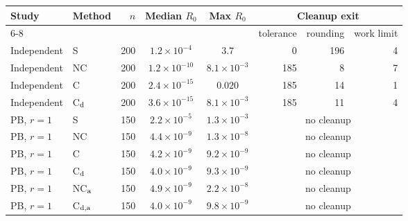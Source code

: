 \begin{tabular}{@{}llr cc rrr@{}}
\toprule
Study & Method & $n$ & Median $R_0$ & Max $R_0$ & \multicolumn{3}{c}{Cleanup exit}\\
\cmidrule(l){6-8}
 & & & & & tolerance & rounding & work limit\\
\midrule
Independent & S & 200 & $1.2\times10^{-4}$ & $3.7$ & 0 & 196 & 4\\
Independent & NC & 200 & $1.2\times10^{-10}$ & $8.1\times10^{-3}$ & 185 & 8 & 7\\
Independent & C & 200 & $2.4\times10^{-15}$ & $0.020$ & 185 & 14 & 1\\
Independent & C$_{\rm d}$ & 200 & $3.6\times10^{-15}$ & $8.1\times10^{-3}$ & 185 & 11 & 4\\
PB, $r=1$ & S & 150 & $2.2\times10^{-5}$ & $1.3\times10^{-3}$ & \multicolumn{3}{c}{no cleanup}\\
PB, $r=1$ & NC & 150 & $4.4\times10^{-9}$ & $1.3\times10^{-8}$ & \multicolumn{3}{c}{no cleanup}\\
PB, $r=1$ & C & 150 & $4.2\times10^{-9}$ & $9.2\times10^{-9}$ & \multicolumn{3}{c}{no cleanup}\\
PB, $r=1$ & C$_{\rm d}$ & 150 & $4.0\times10^{-9}$ & $9.3\times10^{-9}$ & \multicolumn{3}{c}{no cleanup}\\
PB, $r=1$ & NC$_{\rm a}$ & 150 & $4.9\times10^{-9}$ & $2.2\times10^{-8}$ & \multicolumn{3}{c}{no cleanup}\\
PB, $r=1$ & C$_{\rm d,a}$ & 150 & $4.0\times10^{-9}$ & $9.8\times10^{-9}$ & \multicolumn{3}{c}{no cleanup}\\
\bottomrule
\end{tabular}
